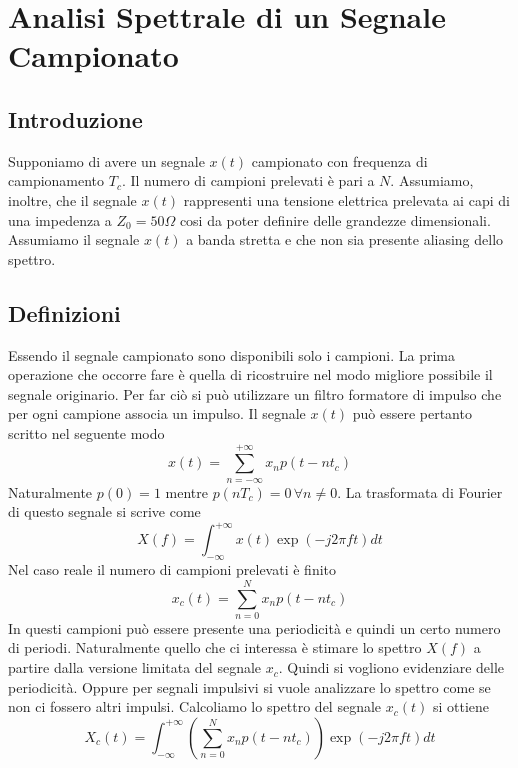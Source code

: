 \documentclass[10pt,a4paper]{book}
\begin{document}
\chapter{Analisi Spettrale di un Segnale  Campionato}
\section{Introduzione}
Supponiamo di avere un segnale $x(t)$  campionato con frequenza di campionamento $T_c$. Il numero di campioni prelevati è pari a $N$. Assumiamo, inoltre, che il segnale $x(t)$ rappresenti una tensione elettrica prelevata ai capi di una impedenza a $Z_0 = 50\Omega$ cosi da poter definire delle grandezze dimensionali. Assumiamo il segnale $x(t)$ a banda stretta e che non sia presente aliasing dello spettro.
\section{Definizioni}
Essendo il segnale campionato sono disponibili solo i campioni. La prima operazione che occorre fare è quella di ricostruire nel modo migliore possibile il segnale originario. 
Per far ciò si può utilizzare un filtro formatore di impulso che per ogni campione associa un impulso. 
Il segnale $x(t)$ può essere pertanto scritto nel seguente modo
\begin{equation}
x(t) = \sum_{n = -\infty}^{+\infty} x_n p(t-n t_c)
\end{equation}
Naturalmente $p(0) = 1$ mentre $p(n T_c) = 0 \,\forall n \neq 0$.
La trasformata di Fourier di questo segnale si scrive come 
\begin{equation}
X(f) = \int_{-\infty}^{+\infty} x(t) \exp(-j 2 \pi f t) dt
\end{equation}
Nel caso reale il numero di campioni prelevati è finito 
\begin{equation}
x_c(t) = \sum_{n = 0}^{N} x_n p(t-n t_c)
\end{equation}
In questi campioni può essere presente una periodicità e quindi un certo numero di periodi. Naturalmente quello che ci interessa è stimare lo spettro $X(f)$ a partire dalla versione limitata del segnale $x_c$. Quindi si vogliono evidenziare delle periodicità. Oppure per segnali impulsivi si vuole analizzare lo spettro come se non ci fossero altri impulsi.
Calcoliamo lo spettro del segnale $x_c(t)$ si ottiene 
\begin{equation}
X_c(t) = \int_{-\infty}^{+\infty} \left(\sum_{n = 0}^{N} x_n p(t-n t_c)\right) \exp(-j 2 \pi f t) dt
\end{equation}
\end{document}

